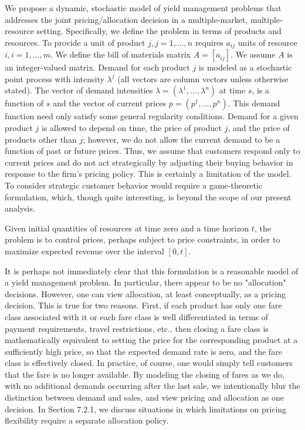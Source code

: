 We propose a dynamic, stochastic model of yield management problems that addresses the joint pricing/allocation decision in a multiple-market, multiple-resource setting. Specifically, we define the problem in terms of products and resources. To provide a unit of product \(j , j = 1 , \ldots , n\) requires \(a _ { i j }\) units of resource \(i , i = 1 , \ldots , m\). We define the bill of materials matrix \(A = [ a _ { i j } ]\). We assume \(A\) is an integer-valued matrix. Demand for each product \(j\) is modeled as a stochastic point process with intensity \(\lambda ^ { j }\) (all vectors are column vectors unless otherwise stated). The vector of demand intensities \(\lambda = ( \lambda ^ { 1 } , \ldots , \lambda ^ { n } )\) at time \(s\), is a function of \(s\) and the vector of current prices \(p = ( p ^ { 1 } , \ldots , p ^ { n } )\). This demand function need only satisfy some general regularity conditions. Demand for a given product \(j\) is allowed to depend on time, the price of product \(j\), and the price of products other than \(j\); however, we do not allow the current demand to be a function of past or future prices. Thus, we assume that customers respond only to current prices and do not act strategically by adjusting their buying behavior in response to the firm's pricing policy. This is certainly a limitation of the model. To consider strategic customer behavior would require a game-theoretic formulation, which, though quite interesting, is beyond the scope of our present analysis.

Given initial quantities of resources at time zero and a time horizon \(t\), the problem is to control prices, perhaps subject to price constraints, in order to maximize expected revenue over the interval \([ 0 , t ]\).

It is perhaps not immediately clear that this formulation is a reasonable model of a yield management problem. In particular, there appear to be no "allocation" decisions. However, one can view allocation, at least conceptually, as a pricing decision. This is true for two reasons. First, if each product has only one fare class associated with it or each fare class is well differentiated in terms of payment requirements, travel restrictions, etc., then closing a fare class is mathematically equivalent to setting the price for the corresponding product at a sufficiently high price, so that the expected demand rate is zero, and the fare class is effectively closed. In practice, of course, one would simply tell customers that the fare is no longer available. By modeling the closing of fares as we do, with no additional demands occurring after the last sale, we intentionally blur the distinction between demand and sales, and view pricing and allocation as one decision. In Section 7.2.1, we discuss situations in which limitations on pricing flexibility require a separate allocation policy.

